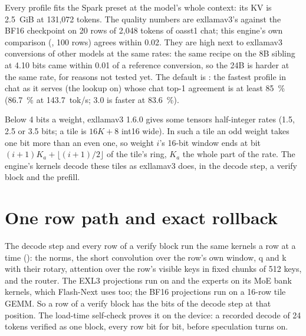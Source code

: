 Every profile fits the Spark preset at the model's whole context: its KV is 2.5~GiB at 131,072 tokens. The quality numbers are exllamav3's  against the BF16 checkpoint on 20 rows of 2,048 tokens of oasst1 chat; this engine's own comparison (, 100 rows) agrees within 0.02. They are high next to exllamav3 conversions of other models at the same rates: the same recipe on the 8B sibling at 4.10 bits came within 0.01 of a reference conversion, so the 24B is harder at the same rate, for reasons not tested yet. The default is : the fastest profile in chat as it serves (the lookup on) whose chat top-1 agreement is at least 85~\% (86.7~\% at 143.7~tok/s; 3.0 is faster at 83.6~\%).



Below 4 bits a weight, exllamav3 1.6.0 gives some tensors half-integer rates (1.5, 2.5 or 3.5 bits; a tile is $16K + 8$ int16 wide). In such a tile an odd weight takes one bit more than an even one, so weight $i$'s 16-bit window ends at bit $(i+1)K_a + \lfloor (i+1)/2 \rfloor$ of the tile's ring, $K_a$ the whole part of the rate. The engine's kernels decode these tiles as exllamav3 does, in the decode step, a verify block and the prefill.

\section{One row path and exact rollback}

The decode step and every row of a verify block run the same kernels a row at a time (): the norms, the short convolution over the row's own window, q and k with their rotary, attention over the row's visible keys in fixed chunks of 512 keys, and the router. The EXL3 projections run on  and the experts on its MoE bank kernels, which Flash-Next uses too; the BF16 projections run on a 16-row tile GEMM. So a row of a verify block has the bits of the decode step at that position. The load-time self-check proves it on the device: a recorded decode of 24 tokens verified as one block, every row bit for bit, before speculation turns on.

